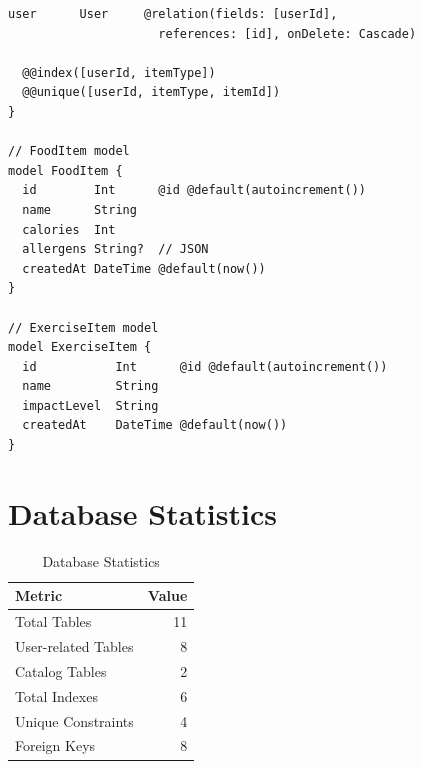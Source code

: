\begin{lstlisting}[caption=Complete Prisma Schema]
  user      User     @relation(fields: [userId], 
                     references: [id], onDelete: Cascade)
  
  @@index([userId, itemType])
  @@unique([userId, itemType, itemId])
}

// FoodItem model
model FoodItem {
  id        Int      @id @default(autoincrement())
  name      String
  calories  Int
  allergens String?  // JSON
  createdAt DateTime @default(now())
}

// ExerciseItem model
model ExerciseItem {
  id           Int      @id @default(autoincrement())
  name         String
  impactLevel  String
  createdAt    DateTime @default(now())
}
\end{lstlisting}

\section{Database Statistics}

\begin{table}[H]
\centering
\begin{tabular}{|l|r|}
\hline
\textbf{Metric} & \textbf{Value} \\
\hline
Total Tables & 11 \\
User-related Tables & 8 \\
Catalog Tables & 2 \\
Total Indexes & 6 \\
Unique Constraints & 4 \\
Foreign Keys & 8 \\
\hline
\end{tabular}
\caption{Database Statistics}
\end{table}
